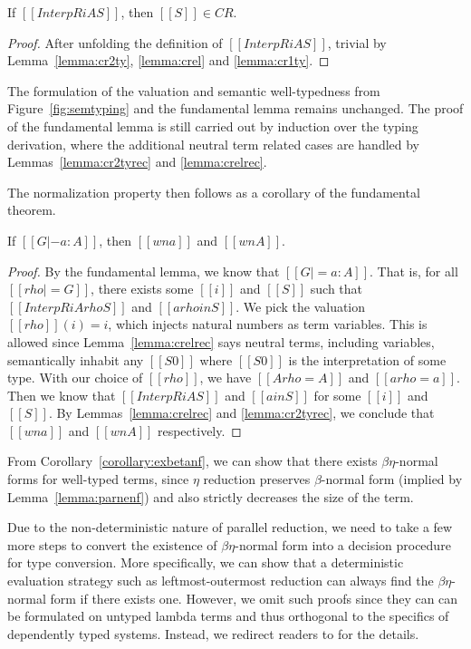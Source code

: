 \documentclass[acmsmall]{acmart}
\begin{document}
\begin{lemma}
  \label{lemma:crelrec}
  If $[[InterpR i A S]]$, then $[[S]] \in CR$.
\end{lemma}
\begin{proof}
  After unfolding the definition of $[[InterpR i A S]]$, trivial by
  Lemma~\ref{lemma:cr2ty}, \ref{lemma:crel} and \ref{lemma:cr1ty}.
\end{proof}

The formulation of the valuation and semantic well-typedness from
Figure~\ref{fig:semtyping} and the fundamental lemma remains
unchanged.
The proof of the fundamental lemma is still carried out by induction
over the typing derivation, where the additional neutral term related
cases are handled by Lemmas~\ref{lemma:cr2tyrec} and
\ref{lemma:crelrec}.

The normalization property then follows as a corollary of the
fundamental theorem.
\begin{corollary}
  \label{corollary:exbetanf}
  If $[[G |- a : A]]$, then $[[wn a]]$ and $[[wn A]]$.
\end{corollary}
\begin{proof}
  By the fundamental lemma, we know that $[[G |= a : A]]$. That is,
  for all $[[rho |= G]]$, there exists some $[[i]]$ and $[[S]]$ such
  that $[[InterpR i A {rho} S]]$ and $[[a {rho} in S]]$.
  We pick the valuation $[[rho]](i) = i$, which injects
  natural numbers as term variables. This is
  allowed since Lemma~\ref{lemma:crelrec} says neutral terms,
  including variables, semantically inhabit any $[[S0]]$ where
  $[[S0]]$ is the interpretation of some type. With our choice of
  $[[rho]]$, we have $[[A {rho} = A]]$ and $[[a {rho} = a]]$. Then we
  know that $[[InterpR i A S]]$ and $[[a in S]]$ for some $[[i]]$ and
  $[[S]]$. By Lemmas~\ref{lemma:crelrec} and \ref{lemma:cr2tyrec}, we
  conclude that $[[wn a]]$ and $[[wn A]]$ respectively.
\end{proof}
From Corollary~\ref{corollary:exbetanf}, we can show that there exists
$\beta\eta$-normal forms for well-typed terms, since $\eta$ reduction
preserves $\beta$-normal form (implied by Lemma~\ref{lemma:parnenf})
and also strictly decreases the size of the term.

Due to the non-deterministic nature of parallel reduction, we need to
take a few more steps to convert the existence of $\beta\eta$-normal
form into a decision procedure for type conversion. More specifically,
we can show that a deterministic evaluation strategy such as
leftmost-outermost reduction can always find the $\beta\eta$-normal
form if there exists one. However, we omit such proofs since they can
can be formulated on untyped lambda terms and thus orthogonal to the
specifics of dependently typed systems. Instead, we redirect readers
to \citet{factorization-essentially, takahashi-parallel-reduction} for
the details.
\end{document}
